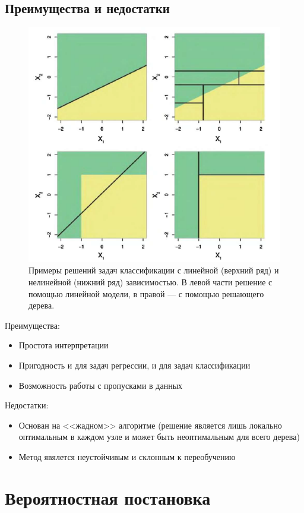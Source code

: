 \documentclass{article}
\theoremstyle{definition}
\theoremstyle{theorem}
\theoremstyle{remark}
\theoremstyle{theorem}
\theoremstyle{example}
\theoremstyle{theorem}
\theoremstyle{theorem}
\theoremstyle{theorem}
\theoremstyle{theorem}
\begin{document}
	\subsection{ Преимущества и недостатки}
		\begin{figure}[h!]
			\includegraphics[width=\textwidth]{linreg_vs_tree}\caption{Примеры решений задач классификации с линейной (верхний ряд) и нелинейной (нижний ряд) зависимостью. В левой части решение с помощью линейной модели, в правой --- с помощью  решающего дерева.}
		\end{figure}
		Преимущества:
\begin{itemize}
\item  Простота интерпретации
\item  Пригодность и для задач регрессии, и для задач классификации
\item  Возможность работы с пропусками в данных
\end{itemize}
Недостатки:
\begin{itemize}
\item Основан на <<жадном>> алгоритме (решение является лишь локально оптимальным в каждом узле и может быть неоптимальным для всего дерева)
\item Метод явялется неустойчивым и склонным к переобучению
\end{itemize}
\newpage

\section{Вероятностная постановка}
\end{document}
